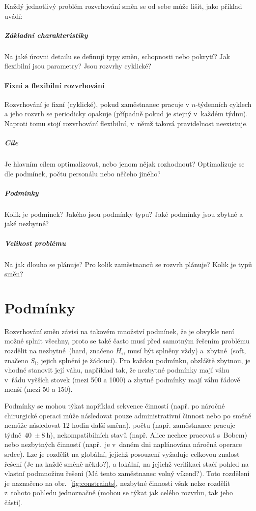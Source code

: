 \documentclass[twoside]{ctuthesis}
\begin{document}
Každý jednotlivý problém rozvrhování směn se od sebe může lišit, \cite{de2011categorisation} jako příklad uvádí:

\subparagraph{Základní charakteristiky}
Na jaké úrovni detailu se definují typy směn, schopnosti nebo pokrytí? Jak flexibilní jsou parametry? Jsou rozvrhy cyklické?

\paragraph{Fixní a flexibilní rozvrhování}
Rozvrhování je fixní (cyklické), pokud zaměstnanec pracuje v $n$-týdenních cyklech a jeho rozvrh se periodicky opakuje (případně pokud je stejný v~každém týdnu). Naproti tomu stojí rozvrhování flexibilní, v~němž taková pravidelnost neexistuje. \cite{burke2004state}

\subparagraph{Cíle}
Je hlavním cílem optimalizovat, nebo jenom nějak rozhodnout? Optimalizuje se dle podmínek, počtu personálu nebo něčeho jiného?

\subparagraph{Podmínky}
Kolik je podmínek? Jakého jsou podmínky typu? Jaké podmínky jsou zbytné a jaké nezbytné?

\subparagraph{Velikost problému}
Na jak dlouho se plánuje? Pro kolik zaměstnanců se rozvrh plánuje? Kolik je typů směn?


\section{Podmínky}
\label{sec:constraints}
Rozvrhování směn závisí na takovém množství podmínek, že je obvykle není možné splnit všechny, proto se také často musí před samotným řešením problému rozdělit na nezbytné~(hard, značeno $H_i$, musí být splněny vždy) a~zbytné~(soft, značeno $S_i$, jejich splnění je žádoucí). \cite{todorovic2012bee} Pro každou podmínku, obzláště zbytnou, je vhodné stanovit její váhu, například tak, že nezbytné podmínky mají váhu v~řádu vyšších stovek (mezi 500 a 1000) a zbytné podmínky mají váhu řádově menší (mezi 50 a 150). \cite{buyukozkan2014applicability}

Podmínky se mohou týkat například sekvence činností (např. po náročné chirurgické operaci může následovat pouze administrativní činnost nebo po směně nemůže následovat 12 hodin další směna), počtu (např. zaměstnanec pracuje týdně~$ 40~\pm 8~\mbox{h}$), nekompatibilních stavů (např. Alice nechce pracovat s~Bobem) nebo nezbytných činností (např.~je v~daném dni naplánována náročná operace srdce). Lze je rozdělit na globální, jejichž posouzení vyžaduje celkovou znalost řešení (Je na každé směně někdo?), a lokální, na jejichž verifikaci stačí pohled na vlastní podmnožinu řešení (Má tento zaměstnanec volný víkend?). Toto rozdělení je naznačeno na obr.~\ref{fig:constraints}, nezbytné činnosti však nelze rozdělit z~tohoto pohledu jednoznačně (mohou se týkat jak celého rozvrhu, tak jeho části). \cite{blochliger2004modeling}
\end{document}
